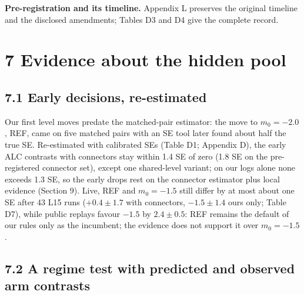 \documentclass[
]{article}
\begin{document}
\textbf{Pre-registration and its timeline.} Appendix L preserves the
original timeline and the disclosed amendments; Tables D3 and D4 give
the complete record.

\section{7 Evidence about the hidden
pool}\label{evidence-about-the-hidden-pool}

\subsection{7.1 Early decisions,
re-estimated}\label{early-decisions-re-estimated}

Our first level moves predate the matched-pair estimator: the move to
\(m_0 = -2.0\), REF, came on five matched pairs with an SE tool later
found about half the true SE. Re-estimated with calibrated SEs (Table
D1; Appendix D), the early ALC contrasts with connectors stay within 1.4
SE of zero (1.8 SE on the pre-registered connector set), except one
shared-level variant; on our logs alone none exceeds 1.3 SE, so the
early drops rest on the connector estimator plus local evidence (Section
9). Live, REF and \(m_0 = -1.5\) still differ by at most about one SE
after 43 L15 runs (\(+0.4 \pm
1.7\) with connectors, \(-1.5 \pm 1.4\) ours only; Table D7), while
public replays favour \(-1.5\) by \(2.4 \pm 0.5\): REF remains the
default of our rules only as the incumbent; the evidence does not
support it over \(m_0 = -1.5\).

\subsection{7.2 A regime test with predicted and observed arm
contrasts}\label{a-regime-test-with-predicted-and-observed-arm-contrasts}
\end{document}
